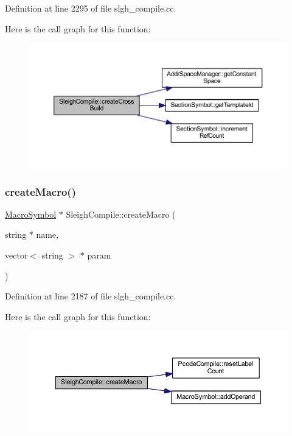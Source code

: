 Definition at line 2295 of file slgh\+\_\+compile.\+cc.

Here is the call graph for this function\+:
\nopagebreak
\begin{figure}[H]
\begin{center}
\leavevmode
\includegraphics[width=350pt]{class_sleigh_compile_ac6de6c64a443c17ee0c0b33d0dbf4458_cgraph}
\end{center}
\end{figure}
\mbox{\label{class_sleigh_compile_a1ccff5875e71c234e97714f364a66ebf}} 
\subsubsection{\texorpdfstring{createMacro()}{createMacro()}}
{\footnotesize\ttfamily \mbox{\hyperlink{class_macro_symbol}{Macro\+Symbol}} $\ast$ Sleigh\+Compile\+::create\+Macro (\begin{DoxyParamCaption}\item[{string $\ast$}]{name,  }\item[{vector$<$ string $>$ $\ast$}]{param }\end{DoxyParamCaption})}



Definition at line 2187 of file slgh\+\_\+compile.\+cc.

Here is the call graph for this function\+:
\nopagebreak
\begin{figure}[H]
\begin{center}
\leavevmode
\includegraphics[width=350pt]{class_sleigh_compile_a1ccff5875e71c234e97714f364a66ebf_cgraph}
\end{center}
\end{figure}
\mbox{\label{class_sleigh_compile_a9576fc0c7e5e7ed41b3adf76a31edd72}} 
